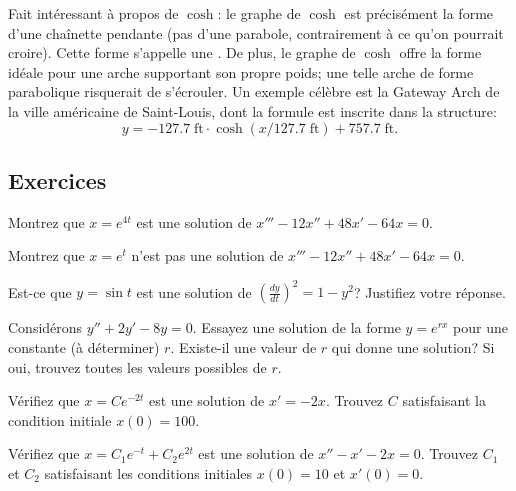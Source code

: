 Fait intéressant à propos de $\cosh$:  le graphe de $\cosh$ est précisément la forme d'une
chaînette pendante (pas d'une parabole, contrairement à ce qu'on pourrait croire).
Cette forme s'appelle une \emph{}.
De plus, le graphe de $\cosh$ offre la forme idéale pour une arche supportant son propre poids;
une telle arche de forme parabolique risquerait de s'écrouler.
Un exemple célèbre est la  {Gateway Arch} de la ville
américaine de Saint-Louis, dont la formule est inscrite dans la structure:
\begin{equation*}
	y = -127.7 \; \textrm{ft} \cdot \cosh\left( x /127.7  \; \textrm{ft} \right) + 757.7 \;\textrm{ft} .
\end{equation*}


\subsection{Exercices}

\begin{exercise}
	Montrez que $x = e^{4t}$ est une solution de $x'''-12 x'' + 48 x' - 64 x = 0$.
\end{exercise}

\begin{exercise}
	Montrez que $x = e^{t}$ n'est pas une solution de $x'''-12 x'' + 48 x' - 64 x = 0$.
\end{exercise}

\begin{exercise}
	Est-ce que $y = \sin t$ est une solution de ${\left( \frac{dy}{dt} \right)}^2 = 1 - y^2$?
	Justifiez votre réponse.
\end{exercise}

\begin{exercise}
	Considérons $y'' + 2y' - 8y = 0$.
	Essayez une solution de la forme $y = e^{rx}$ pour une constante (à déterminer) $r$.
	Existe-il une valeur de $r$ qui donne une solution? Si oui, trouvez toutes les valeurs possibles de $r$.
\end{exercise}

\begin{exercise}
	Vérifiez que $x = C e^{-2t}$ est une solution de $x' = -2x$.
	Trouvez $C$ satisfaisant la condition initiale $x(0) = 100$.
\end{exercise}

\begin{exercise}
	Vérifiez que $x = C_1 e^{-t} + C_2 e^{2t}$ est une solution de $x'' - x' -2 x =	0$.
	Trouvez $C_1$ et $C_2$ satisfaisant les conditions initiales $x(0) = 10$
	et $x'(0) = 0$.
\end{exercise}

